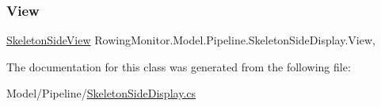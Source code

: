 \subsubsection{\texorpdfstring{View}{View}}
{\footnotesize\ttfamily \hyperlink{class_rowing_monitor_1_1_view_1_1_skeleton_side_view}{Skeleton\+Side\+View} Rowing\+Monitor.\+Model.\+Pipeline.\+Skeleton\+Side\+Display.\+View\hspace{0.3cm}{\ttfamily [get]}, {\ttfamily [set]}}



The documentation for this class was generated from the following file\+:\begin{DoxyCompactItemize}
\item 
Model/\+Pipeline/\hyperlink{_skeleton_side_display_8cs}{Skeleton\+Side\+Display.\+cs}\end{DoxyCompactItemize}
